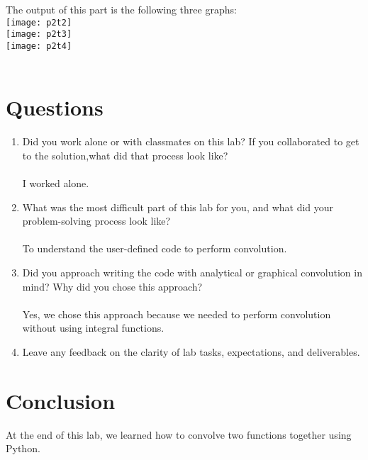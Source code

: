 \documentclass[11pt,a4]{article}
\begin{document}
	The output of this part is the following three graphs:\\

	\texttt{[image: p2t2]}\\   
	\texttt{[image: p2t3]}\\
	\texttt{[image: p2t4]}\\
	\
	
	\section{Questions}
	
	\begin{enumerate}
		\item 
		Did you work alone or with classmates on this lab? If you collaborated to get to the solution,what did that process look like?\\
		\\I worked alone.\\
		
		\item
		What was the most difficult part of this lab for you, and what did your problem-solving process look like?\\
		\\To understand the user-defined code to perform convolution.\\
		
		\item
		Did you approach writing the code with analytical or graphical convolution in mind? Why did you chose this approach?\\
		\\Yes, we chose this approach because we needed to perform convolution without using integral functions.\\
		
		\item
		Leave any feedback on the clarity of lab tasks, expectations, and deliverables.\\

	\end{enumerate}

	\section{Conclusion}
	
	At the end of this lab, we learned how to convolve two functions together using Python. 
	
\end{document}
